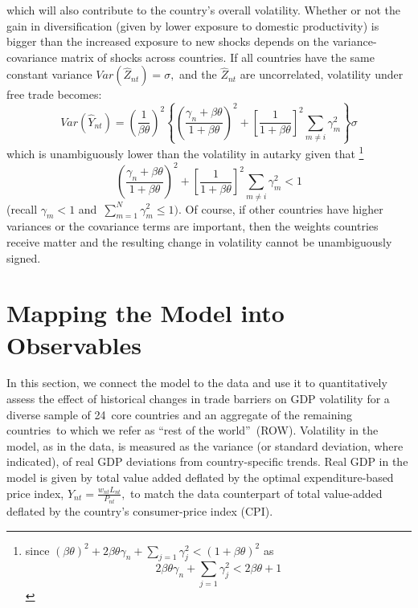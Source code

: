 \documentclass[12pt]{article}
\begin{document}
which will also contribute to the country's overall volatility. Whether or
not the gain in diversification (given by lower exposure to domestic
productivity) is bigger than the increased exposure to new shocks depends on
the variance-covariance matrix of shocks across countries. If all countries
have the same constant variance $Var(\hat{Z}_{nt})=\sigma ,$ and the $\hat{Z}%
_{nt}$ are uncorrelated, volatility under free trade becomes: 
\begin{equation}
Var(\hat{Y}_{nt})=\left( \frac{1}{\beta \theta }\right) ^{2}\left\{ \left( 
\frac{\gamma _{n}+\beta \theta }{1+\beta \theta }\right) ^{2}+\left[ \frac{1%
}{1+\beta \theta }\right] ^{2}\sum_{m\neq i}\gamma _{m}^{2}\right\} \sigma
\end{equation}%
which is unambiguously lower than the volatility in autarky given that%
\footnote{%
since $\left( \beta \theta \right) ^{2}+2\beta \theta \gamma
_{n}+\sum_{j=1}\gamma _{j}^{2}<(1+\beta \theta )^{2}$ as 
\begin{equation*}
2\beta \theta \gamma _{n}+\sum_{j=1}\gamma _{j}^{2}<2\beta \theta +1
\end{equation*}%
} 
\begin{equation}
\left( \frac{\gamma _{n}+\beta \theta }{1+\beta \theta }\right) ^{2}+\left[ 
\frac{1}{1+\beta \theta }\right] ^{2}\sum_{m\neq i}\gamma _{m}^{2}<1
\label{derivelater}
\end{equation}%
(recall $\gamma _{m}<1$ and\ $\sum_{m=1}^{N}\gamma _{m}^{2}\leq 1)$. Of
course, if other countries have higher variances or the covariance terms are
important, then the weights countries receive matter and the resulting
change in volatility cannot be unambiguously signed.

\section{Mapping the Model into Observables}

\label{mapping_into_observables} In this section, we connect the model to
the data and use it to quantitatively assess the effect of historical
changes in trade barriers on GDP volatility for a diverse sample of 24\ core
countries and an aggregate of the remaining countries\ to which we refer as
\textquotedblleft rest of the world\textquotedblright\ (ROW). Volatility in
the model, as in the data, is measured as the variance (or standard
deviation, where indicated), of real GDP deviations from country-specific
trends. Real GDP in the model is given by total value added deflated by the
optimal expenditure-based price index, $Y_{nt}=\frac{w_{nt}L_{nt}}{P_{nt}},$
to match the data counterpart of total value-added deflated by the country's
consumer-price index (CPI).
\end{document}
